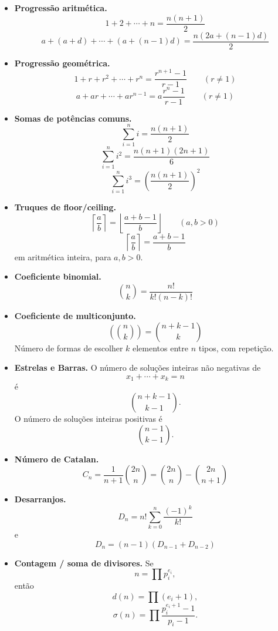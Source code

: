\begin{itemize}[leftmargin=*,label={}]
  \item \textbf{Progress\~ao aritm\'etica.}
  \[
    1+2+\cdots+n = \frac{n(n+1)}{2}
  \]
  \[
    a + (a+d) + \cdots + (a+(n-1)d)
    = \frac{n(2a+(n-1)d)}{2}
  \]

  \item \textbf{Progress\~ao geom\'etrica.}
  \[
    1+r+r^2+\cdots+r^n = \frac{r^{n+1}-1}{r-1}\qquad (r\ne1)
  \]
  \[
    a+ar+\cdots+ar^{n-1} = a\frac{r^n-1}{r-1}\qquad (r\ne1)
  \]

  \item \textbf{Somas de pot\^encias comuns.}
  \[
    \sum_{i=1}^n i = \frac{n(n+1)}{2}
  \]
  \[
    \sum_{i=1}^n i^2 = \frac{n(n+1)(2n+1)}{6}
  \]
  \[
    \sum_{i=1}^n i^3 = \left(\frac{n(n+1)}{2}\right)^2
  \]

  \item \textbf{Truques de floor/ceiling.}
  \[
    \left\lceil \frac{a}{b} \right\rceil = \left\lfloor \frac{a+b-1}{b} \right\rfloor
    \qquad (a,b>0)
  \]
  \[
    \left\lceil \frac{a}{b} \right\rceil = \frac{a+b-1}{b}
  \]
  em aritm\'etica inteira, para $a,b>0$.

  \ifextended
  \item \textbf{Coeficiente binomial.}
  \[
    \binom{n}{k}=\frac{n!}{k!(n-k)!}
  \]
  \fi

  \item \textbf{Coeficiente de multiconjunto.}
  \[
    \left(\!\binom{n}{k}\!\right)=\binom{n+k-1}{k}
  \]
  N\'umero de formas de escolher $k$ elementos entre $n$ tipos, com repeti\c{c}\~ao.

  \item \textbf{Estrelas e Barras.}
  O n\'umero de solu\c{c}\~oes inteiras n\~ao negativas de
  \[
    x_1+\cdots+x_k=n
  \]
  \'e
  \[
    \binom{n+k-1}{k-1}.
  \]
  O n\'umero de solu\c{c}\~oes inteiras positivas \'e
  \[
    \binom{n-1}{k-1}.
  \]

  \item \textbf{N\'umero de Catalan.}
  \[
    C_n=\frac{1}{n+1}\binom{2n}{n}
       =\binom{2n}{n}-\binom{2n}{n+1}
  \]

  \item \textbf{Desarranjos.}
  \[
    D_n = n!\sum_{k=0}^{n}\frac{(-1)^k}{k!}
  \]
  e
  \[
    D_n = (n-1)(D_{n-1}+D_{n-2})
  \]

  \item \textbf{Contagem / soma de divisores.}
  Se
  \[
    n=\prod p_i^{e_i},
  \]
  ent\~ao
  \[
    d(n)=\prod (e_i+1),
  \]
  \[
    \sigma(n)=\prod \frac{p_i^{e_i+1}-1}{p_i-1}.
  \]


\end{itemize}

